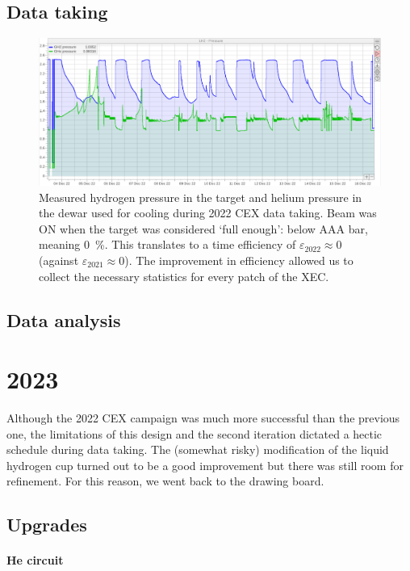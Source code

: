 \begin{refsection}
    \subsection{Data taking}
        \begin{figure}
            \centering
            \includegraphics[width = \textwidth]{Figures/LH2/2022CEX_LH2.png}
            \caption{Measured hydrogen pressure in the target and helium pressure in the dewar used for cooling during 2022 CEX data taking. 
            Beam was ON when the target was considered `full enough': below AAA bar, meaning \SI{0}{\%}.  
            This translates to a time efficiency of $\varepsilon_{2022}\approx0$ (against $\varepsilon_{2021}\approx0$). 
            The improvement in efficiency allowed us to collect the necessary statistics for every patch of the XEC.}
            \label{fig:CEX2022}
        \end{figure}

    \subsection{Data analysis}

\section{2023}
    Although the 2022 CEX campaign was much more successful than the previous one, the limitations of this design and the second iteration dictated a hectic schedule during data taking. 
    The (somewhat risky) modification of the liquid hydrogen cup turned out to be a good improvement but there was still room for refinement. 
    For this reason, we went back to the drawing board.

    \subsection{Upgrades}
        \paragraph{He circuit}

\end{refsection}
